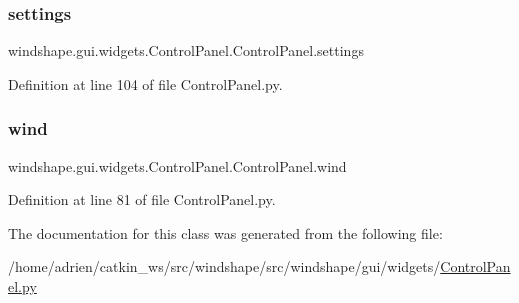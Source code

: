 \subsubsection{\texorpdfstring{settings}{settings}}
{\footnotesize\ttfamily windshape.\+gui.\+widgets.\+Control\+Panel.\+Control\+Panel.\+settings}



Definition at line 104 of file Control\+Panel.\+py.

\mbox{\label{classwindshape_1_1gui_1_1widgets_1_1_control_panel_1_1_control_panel_a4f60583cb4426f8d0de0ce906d18720e}} 
\subsubsection{\texorpdfstring{wind}{wind}}
{\footnotesize\ttfamily windshape.\+gui.\+widgets.\+Control\+Panel.\+Control\+Panel.\+wind}



Definition at line 81 of file Control\+Panel.\+py.



The documentation for this class was generated from the following file\+:\begin{DoxyCompactItemize}
\item 
/home/adrien/catkin\+\_\+ws/src/windshape/src/windshape/gui/widgets/\mbox{\hyperlink{_control_panel_8py}{Control\+Panel.\+py}}\end{DoxyCompactItemize}
